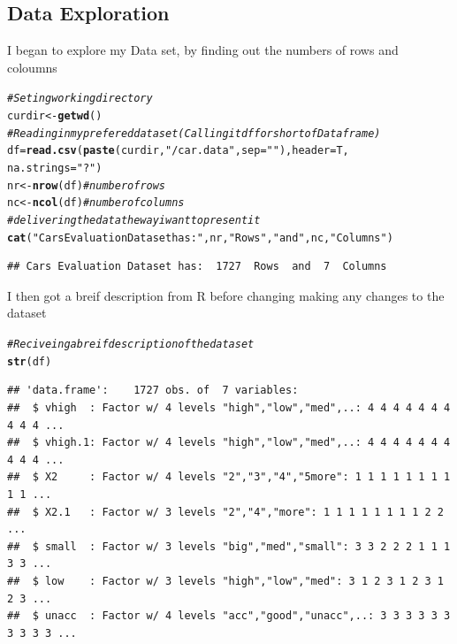 \documentclass{article}\usepackage[]{graphicx}\usepackage[]{color}
\makeatletter
\newcommand{\hlstr}[1]{\textcolor[rgb]{0.192,0.494,0.8}{#1}}%
\newcommand{\hlcom}[1]{\textcolor[rgb]{0.678,0.584,0.686}{\textit{#1}}}%
\newcommand{\hlstd}[1]{\textcolor[rgb]{0.345,0.345,0.345}{#1}}%
\newcommand{\hlkwb}[1]{\textcolor[rgb]{0.69,0.353,0.396}{#1}}%
\newcommand{\hlkwc}[1]{\textcolor[rgb]{0.333,0.667,0.333}{#1}}%
\newcommand{\hlkwd}[1]{\textcolor[rgb]{0.737,0.353,0.396}{\textbf{#1}}}%
\newenvironment{kframe}{%
 \def\at@end@of@kframe{}%
 \ifinner\ifhmode%
  \def\at@end@of@kframe{\end{minipage}}%
  \begin{minipage}{\columnwidth}%
 \fi\fi%
 \def\FrameCommand##1{\hskip\@totalleftmargin \hskip-\fboxsep
 \colorbox{shadecolor}{##1}\hskip-\fboxsep
     \hskip-\linewidth \hskip-\@totalleftmargin \hskip\columnwidth}%
 \MakeFramed {\advance\hsize-\width
   \@totalleftmargin\z@ \linewidth\hsize
   \@setminipage}}%
 {\par\unskip\endMakeFramed%
 \at@end@of@kframe}
\newenvironment{knitrout}{}{} %
\makeatother
\begin{document}
\subsection{Data Exploration} 
I began to explore my Data set, by finding out the numbers of rows and coloumns
\begin{knitrout}
\color{fgcolor}\begin{kframe}
\begin{alltt}
\hlcom{#Seting working directory}
    \hlstd{curdir} \hlkwb{<-} \hlkwd{getwd}\hlstd{()}
\hlcom{#Reading in my prefered dataset(Calling it df for short of Data frame)}
  \hlstd{df}\hlkwb{=}\hlkwd{read.csv}\hlstd{(}\hlkwd{paste}\hlstd{(curdir,}\hlstr{"/car.data"}\hlstd{,}\hlkwc{sep} \hlstd{=} \hlstr{""}\hlstd{),}\hlkwc{header}\hlstd{=T,}
              \hlkwc{na.strings}\hlstd{=}\hlstr{"?"}\hlstd{)}
  \hlstd{nr} \hlkwb{<-} \hlkwd{nrow}\hlstd{(df)} \hlcom{# number of rows}
  \hlstd{nc} \hlkwb{<-} \hlkwd{ncol}\hlstd{(df)} \hlcom{# number of columns}
\hlcom{#delivering the data the way i want to present it }
  \hlkwd{cat} \hlstd{(}\hlstr{"Cars Evaluation Dataset has: "}\hlstd{, nr,}\hlstr{" Rows"}\hlstd{,} \hlstr{" and "}\hlstd{,nc,} \hlstr{" Columns"}\hlstd{)}
\end{alltt}
\begin{verbatim}
## Cars Evaluation Dataset has:  1727  Rows  and  7  Columns
\end{verbatim}
\end{kframe}
\end{knitrout}
I then got a breif description from R before changing making any changes to the dataset
\begin{knitrout}
\color{fgcolor}\begin{kframe}
\begin{alltt}
\hlcom{#Reciveing a breif description of the data set}
  \hlkwd{str}\hlstd{(df)}
\end{alltt}
\begin{verbatim}
## 'data.frame':	1727 obs. of  7 variables:
##  $ vhigh  : Factor w/ 4 levels "high","low","med",..: 4 4 4 4 4 4 4 4 4 4 ...
##  $ vhigh.1: Factor w/ 4 levels "high","low","med",..: 4 4 4 4 4 4 4 4 4 4 ...
##  $ X2     : Factor w/ 4 levels "2","3","4","5more": 1 1 1 1 1 1 1 1 1 1 ...
##  $ X2.1   : Factor w/ 3 levels "2","4","more": 1 1 1 1 1 1 1 1 2 2 ...
##  $ small  : Factor w/ 3 levels "big","med","small": 3 3 2 2 2 1 1 1 3 3 ...
##  $ low    : Factor w/ 3 levels "high","low","med": 3 1 2 3 1 2 3 1 2 3 ...
##  $ unacc  : Factor w/ 4 levels "acc","good","unacc",..: 3 3 3 3 3 3 3 3 3 3 ...
\end{verbatim}
\end{kframe}
\end{knitrout}
\end{document}
